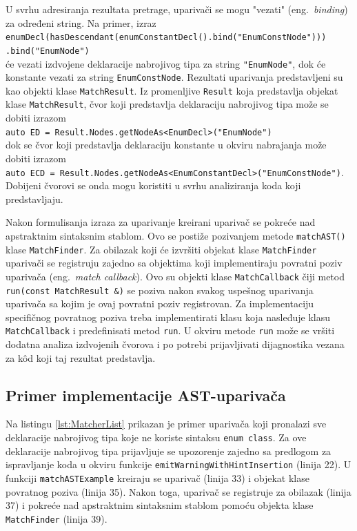\documentclass[12pt,oneside]{memoir}
\begin{document}
U svrhu adresiranja rezultata pretrage, upariva\v{c}i se mogu "vezati" (eng.~\textit{binding}) za određeni string. Na primer, izraz \\
\texttt{enumDecl(hasDescendant(enumConstantDecl().bind("EnumConstNode")))} \\
\hspace*{9cm}\texttt{.bind("EnumNode")} \\ će vezati izdvojene deklaracije nabrojivog tipa za string \texttt{"EnumNode"}, dok \'{c}e konstante vezati za string \texttt{EnumConstNode}. Rezultati uparivanja predstavljeni su kao objekti klase \texttt{MatchResult}. Iz promenljive \texttt{Result} koja predstavlja objekat klase \texttt{MatchResult}, \v{c}vor koji predstavlja deklaraciju nabrojivog tipa
mo\v{z}e se dobiti izrazom \\ \texttt{auto ED = Result.Nodes.getNodeAs<EnumDecl>("EnumNode")} \\
dok se \v{c}vor koji predstavlja deklaraciju konstante u okviru nabrajanja mo\v{z}e dobiti izrazom \\ \texttt{auto ECD = Result.Nodes.getNodeAs<EnumConstantDecl>("EnumConstNode")}.\\ Dobijeni \v{c}vorovi se onda mogu koristiti u svrhu analiziranja
koda koji predstavljaju.

\par
Nakon formulisanja izraza za uparivanje kreirani upariva\v{c} se pokre\'{c}e nad apstraktnim sintaksnim stablom. Ovo se posti\v{z}e pozivanjem metode \texttt{matchAST()} klase \texttt{MatchFinder}. 
Za obilazak koji \'{c}e izvr\v{s}iti objekat klase \texttt{MatchFinder} upariva\v{c}i se registruju zajedno sa objektima koji implementiraju povratni poziv upariva\v{c}a (eng.~\textit{match callback}). 
Ovo su objekti klase \texttt{MatchCallback} \v{c}iji metod \texttt{run(const MatchResult \&)} se poziva nakon svakog uspe\v{s}nog uparivanja 
upariva\v{c}a sa kojim je ovaj povratni poziv registrovan. Za implementaciju specifi\v{c}nog povratnog poziva treba implementirati klasu koja nasleđuje klasu \texttt{MatchCallback} i predefinisati metod \texttt{run}. U okviru metode \texttt{run} mo\v{z}e se vr\v{s}iti dodatna analiza izdvojenih \v{c}vorova i po potrebi
prijavljivati dijagnostika vezana za k\^{o}d koji taj rezultat predstavlja. 
\subsection{Primer implementacije AST-upariva\v{c}a}
Na listingu \ref{lst:MatcherList} prikazan je primer upariva\v{c}a koji pronalazi sve deklaracije nabrojivog tipa koje ne koriste sintaksu \texttt{enum class}. Za ove deklaracije nabrojivog tipa prijavljuje se upozorenje zajedno sa predlogom za ispravljanje koda u okviru funkcije \texttt{emitWarningWithHintInsertion} (linija 22). U funkciji \texttt{matchASTExample} kreiraju se upariva\v{c} (linija 33) i objekat klase povratnog poziva (linija 35). Nakon toga, upariva\v{c} se registruje za obilazak (linija 37) i pokre\'{c}e nad apstraktnim sintaksnim stablom pomo\'{c}u objekta klase \texttt{MatchFinder} (linija 39).
\end{document}
